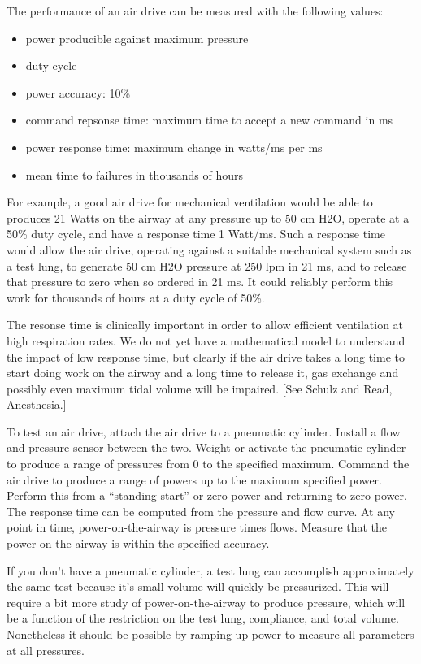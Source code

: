 \documentclass{article}
\begin{document}
The performance of an air drive can be measured with the following values:
\begin{itemize}
\item{power producible against maximum pressure}
\item{duty cycle}
\item{power accuracy: 10\%}
\item{command repsonse time: maximum time to accept a new command in ms}
\item{power response time: maximum change in watts/ms per ms}
\item{mean time to failures in thousands of hours}
\end{itemize}


For example, a good air drive for mechanical ventilation would be
able to produces 21 Watts on the airway at any pressure up to 50 cm H2O, operate at a
50\% duty cycle, and have a response time 1 Watt/ms. Such a response time
would allow the air drive, operating against a suitable mechanical system such
as a test lung, to generate 50 cm H2O pressure at 250 lpm in 21 ms, and
to release that pressure to zero when so ordered in 21 ms.
It could reliably perform this work for thousands of hours at a duty cycle of 50\%.

The resonse time is clinically important in order to allow efficient ventilation
at high respiration rates.
We do not yet have a mathematical model to understand the impact of low response time,
but clearly if the air drive takes a long time to start doing work on the airway
and a long time to release it, gas exchange and possibly even maximum tidal volume
will be impaired. [See Schulz and Read, Anesthesia.]

To test an air drive, attach the air drive to a pneumatic cylinder. Install a flow
and pressure sensor between the two. Weight or activate the pneumatic cylinder
to produce a range of pressures from 0 to the specified maximum. Command the air drive
to produce a range of powers up to the maximum specified power. Perform this
from a ``standing start'' or zero power and returning to zero power. The response time
can be computed from the pressure and flow curve. At any point in time, power-on-the-airway
is pressure times flows. Measure that the power-on-the-airway is within the specified
accuracy.

If you don't have a pneumatic cylinder, a test lung can accomplish approximately the
same test because it's small volume will quickly be pressurized. This will require
a bit more study of power-on-the-airway to produce pressure, which will be a function
of the restriction on the test lung, compliance, and total volume. Nonetheless it should
be possible by ramping up power to measure all parameters at all pressures.
\end{document}
